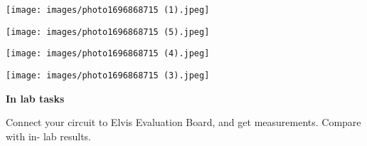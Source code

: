 \documentclass{article}
\begin{document}
\begin{flushleft}
    \centering
    \texttt{[image: images/photo1696868715 (1).jpeg]}
\end{flushleft}




\begin{flushleft}
    \centering
    \texttt{[image: images/photo1696868715 (5).jpeg]}
\end{flushleft}


\begin{flushleft}
    \centering
    \texttt{[image: images/photo1696868715 (4).jpeg]}
\end{flushleft}

\begin{flushleft}
    \centering
    \texttt{[image: images/photo1696868715 (3).jpeg]}
\end{flushleft}

\begin{flushleft}
\textbf{In lab tasks}
\end{flushleft}

Connect your circuit to Elvis Evaluation Board, and get measurements. Compare with in- lab results.





\end{document}
